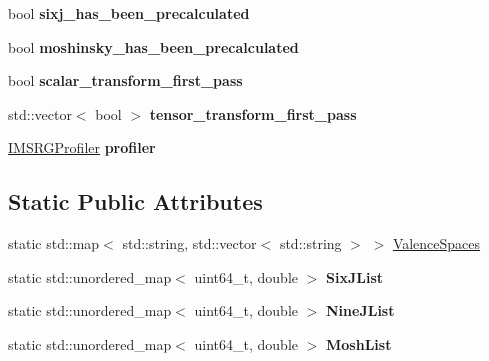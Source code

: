 \begin{DoxyCompactItemize}
\item 
\mbox{\label{classModelSpace_add8f51396475dd1c0035a1a9e6e6f452}} 
bool {\bfseries sixj\+\_\+has\+\_\+been\+\_\+precalculated}
\item 
\mbox{\label{classModelSpace_a4efe26f443e19138189e8934c7eda80c}} 
bool {\bfseries moshinsky\+\_\+has\+\_\+been\+\_\+precalculated}
\item 
\mbox{\label{classModelSpace_ab871d46ec0a635ed4816e99cbe5bb573}} 
bool {\bfseries scalar\+\_\+transform\+\_\+first\+\_\+pass}
\item 
\mbox{\label{classModelSpace_a1319e368bcbc377096bf22e8752bee4a}} 
std\+::vector$<$ bool $>$ {\bfseries tensor\+\_\+transform\+\_\+first\+\_\+pass}
\item 
\mbox{\label{classModelSpace_a9d5b193fe45f361371beb818bfe00fd3}} 
\hyperlink{classIMSRGProfiler}{I\+M\+S\+R\+G\+Profiler} {\bfseries profiler}
\end{DoxyCompactItemize}
\subsection*{Static Public Attributes}
\begin{DoxyCompactItemize}
\item 
static std\+::map$<$ std\+::string, std\+::vector$<$ std\+::string $>$ $>$ \hyperlink{classModelSpace_a21e4c6a5d3955dc9bf468cece4b8acc5}{Valence\+Spaces}
\item 
\mbox{\label{classModelSpace_af6bd9ab44e6ae41af6bc8b1bba353360}} 
static std\+::unordered\+\_\+map$<$ uint64\+\_\+t, double $>$ {\bfseries Six\+J\+List}
\item 
\mbox{\label{classModelSpace_a41b96c5af74d6813de7ef314707fbe65}} 
static std\+::unordered\+\_\+map$<$ uint64\+\_\+t, double $>$ {\bfseries Nine\+J\+List}
\item 
\mbox{\label{classModelSpace_a022d742964d160c05570951936846b59}} 
static std\+::unordered\+\_\+map$<$ uint64\+\_\+t, double $>$ {\bfseries Mosh\+List}
\end{DoxyCompactItemize}


